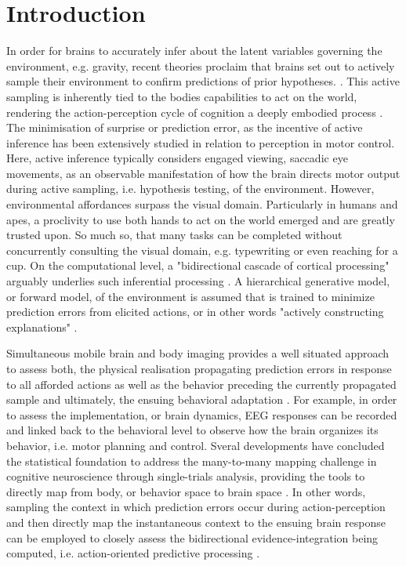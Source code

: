 \section{Introduction}
In order for brains to accurately infer about the latent variables governing the environment, e.g. gravity, recent theories proclaim that brains set out to actively sample their environment to confirm predictions of prior hypotheses. \cites{Clark2013, Friston2010, Rao1999}. This active sampling is inherently tied to the bodies capabilities to act on the world, rendering the action-perception cycle of cognition a deeply embodied process \cite{Friston2012}. The minimisation of surprise or prediction error, as the incentive of active inference has been extensively studied in relation to perception in motor control. Here, active inference typically considers engaged viewing, saccadic eye movements, as an observable manifestation of how the brain directs motor output during active sampling, i.e. hypothesis testing, of the environment. However, environmental affordances surpass the visual domain. Particularly in humans and apes, a proclivity to use both hands to act on the world emerged and are greatly trusted upon. So much so, that many tasks can be completed without concurrently consulting the visual domain, e.g. typewriting or even reaching for a cup. On the computational level, a "bidirectional cascade of cortical processing" arguably underlies such inferential processing \cite{Clark2013}. A hierarchical generative model, or forward model, of the environment is assumed that is trained to minimize prediction errors from elicited actions, or in other words "actively constructing explanations" \cite{Wolpert2011, Friston2018}. 

Simultaneous mobile brain and body imaging provides a well situated approach to assess both, the physical realisation propagating prediction errors in response to all afforded actions as well as the behavior preceding the currently propagated sample and ultimately, the ensuing behavioral adaptation \cites{Gramann2014, Makeig2009}. For example, in order to assess the implementation, or brain dynamics, EEG responses can be recorded and linked back to the behavioral level to observe how the brain organizes its behavior, i.e. motor planning and control. Sveral developments have concluded the statistical foundation to address the many-to-many mapping challenge in cognitive neuroscience through single-trials analysis, providing the tools to directly map from body, or behavior space to brain space \cites{Pernet2011, Bridwell2018, Friston1994b, Blankertz2011}. In other words, sampling the context in which prediction errors occur during action-perception and then directly map the instantaneous context to the ensuing brain response can be employed to closely assess the bidirectional evidence-integration being computed, i.e. action-oriented predictive processing \cite{Clark2013, Gehrke2018}.